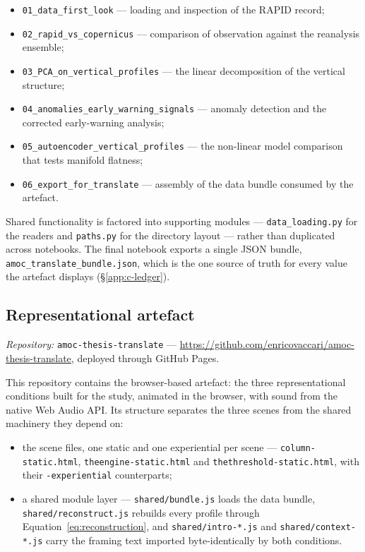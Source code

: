 \begin{itemize}
    \item \texttt{01\_data\_first\_look} --- loading and inspection of the RAPID record;
    \item \texttt{02\_rapid\_vs\_copernicus} --- comparison of observation against the
          reanalysis ensemble;
    \item \texttt{03\_PCA\_on\_vertical\_profiles} --- the linear decomposition of the
          vertical structure;
    \item \texttt{04\_anomalies\_early\_warning\_signals} --- anomaly detection and the
          corrected early-warning analysis;
    \item \texttt{05\_autoencoder\_vertical\_profiles} --- the non-linear model comparison
          that tests manifold flatness;
    \item \texttt{06\_export\_for\_translate} --- assembly of the data bundle consumed by the
          artefact.
\end{itemize}

\noindent Shared functionality is factored into supporting modules --- \texttt{data\_loading.py}
for the readers and \texttt{paths.py} for the directory layout --- rather than duplicated
across notebooks. The final notebook exports a single JSON bundle,
\texttt{amoc\_translate\_bundle.json}, which is the one source of truth for every value the
artefact displays (\S\ref{app:c-ledger}).

\subsection*{Representational artefact}
\textit{Repository:} \texttt{amoc-thesis-translate} ---
\url{https://github.com/enricovaccari/amoc-thesis-translate}, deployed through GitHub Pages.

This repository contains the browser-based artefact: the three representational conditions
built for the study, animated in the browser, with sound from the native Web Audio API. Its
structure separates the three scenes from the shared machinery they depend on:

\begin{itemize}
    \item the scene files, one static and one experiential per scene ---
          \nolinkurl{column-static.html}, \nolinkurl{theengine-static.html} and
          \nolinkurl{thethreshold-static.html}, with their \texttt{-experiential} counterparts;
    \item a shared module layer --- \texttt{shared/bundle.js} loads the data bundle,
          \texttt{shared/reconstruct.js} rebuilds every profile through
          Equation~\ref{eq:reconstruction}, and \texttt{shared/intro-*.js} and
          \texttt{shared/context-*.js} carry the framing text imported byte-identically by
          both conditions.
\end{itemize}

